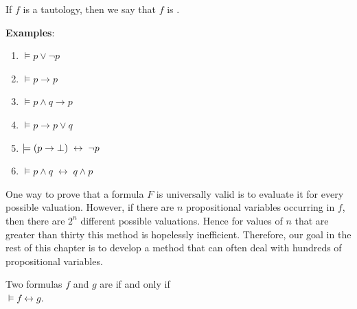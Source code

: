 \noindent
If $f$ is a tautology, then we say that $f$ is  .

\noindent
\textbf{Examples}:
\begin{enumerate}
\item $\models p \vee \neg p$
\item $\models p \rightarrow p$
\item $\models p \wedge q \rightarrow p$
\item $\models p \rightarrow p \vee q$
\item $\models (p \rightarrow \bot) \;\leftrightarrow\; \neg p$
\item $\models p \wedge q \;\leftrightarrow\; q \wedge p$
\end{enumerate}
One way to prove that a formula $F$ is universally valid is to evaluate it for every possible valuation.
However, if there are $n$ propositional variables occurring in $f$, then there are $2^n$ different possible
valuations. 
Hence for values of $n$ that are greater than thirty this method is hopelessly inefficient.  Therefore, our
goal in the rest of this chapter is to develop 
a method that can often deal with hundreds of propositional variables.

\begin{Definition}[Equivalent]
  Two formulas $f$ and $g$ are   if and only if  \\[0.2cm]
  \hspace*{1.3cm} $\models f \leftrightarrow g$.   
  \eox
\end{Definition}

